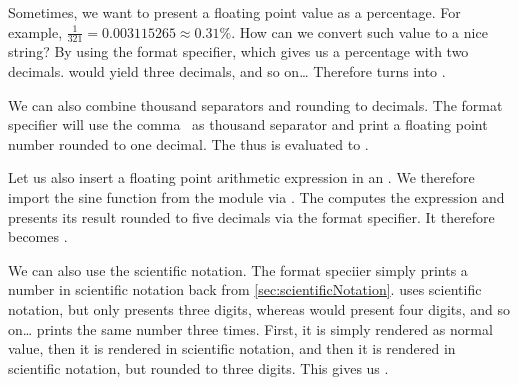%
\begin{sloppypar}%
Sometimes, we want to present a floating point value as a percentage.
For example, $\frac{1}{321}=0.003115265\approx0.31\%$.
How can we convert such value to a nice string?
By using the  format specifier, which gives us a percentage with two decimals.
 would yield three decimals, and so on{\dots}
Therefore  turns into .%
\end{sloppypar}%
%
\begin{sloppypar}%
We can also combine thousand separators and rounding to decimals.
The format specifier  will use the comma~\inQuotes{,} as thousand separator and print a floating point number rounded to one decimal.
The   thus is evaluated to .%
\end{sloppypar}%
%
\begin{sloppypar}%
Let us also insert a floating point arithmetic expression in an .
We therefore import the sine function  from the  module via .
The   computes the expression  and presents its result rounded to five decimals via the  format specifier.
It therefore becomes .%
\end{sloppypar}%
%
\begin{sloppypar}%
We can also use the scientific notation.
The format speciier  simply prints a number in scientific notation back from \cref{sec:scientificNotation}.
 uses scientific notation, but only presents three digits, whereas  would present four digits, and so on{\dots}
 prints the same number three times.
First, it is simply rendered as normal  value, then it is rendered in scientific notation, and then it is rendered in scientific notation, but rounded to three digits.
This gives us .%
\end{sloppypar}%
